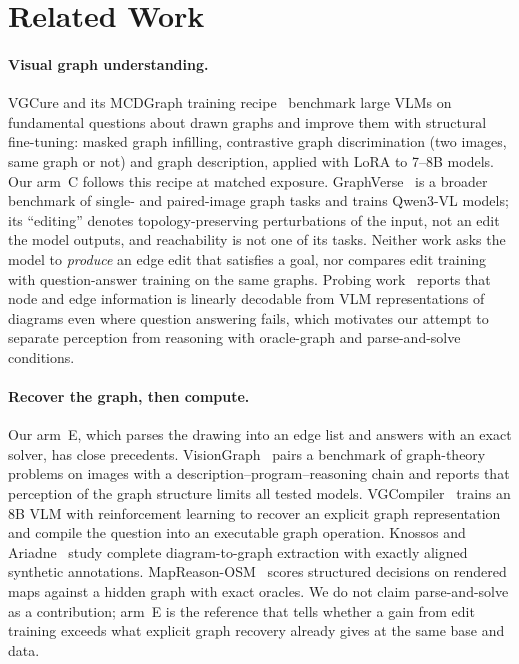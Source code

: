 \section{Related Work}
\label{sec:related}

\paragraph{Visual graph understanding.}
VGCure and its MCDGraph training recipe~\cite{mcdgraph} benchmark large VLMs on
fundamental questions about drawn graphs and improve them with structural fine-tuning:
masked graph infilling, contrastive graph discrimination (two images, same graph or not)
and graph description, applied with LoRA to 7--8B models. Our arm~C follows this recipe
at matched exposure. GraphVerse~\cite{graphverse} is a broader benchmark of single- and
paired-image graph tasks and trains Qwen3-VL models; its ``editing'' denotes
topology-preserving perturbations of the input, not an edit the model outputs, and
reachability is not one of its tasks. Neither work asks the model to \emph{produce} an
edge edit that satisfies a goal, nor compares edit training with question-answer training
on the same graphs. Probing work~\cite{signals} reports that node and edge information
is linearly decodable from VLM representations of diagrams even where question answering
fails, which motivates our attempt to separate perception from reasoning with oracle-graph and
parse-and-solve conditions.

\paragraph{Recover the graph, then compute.}
Our arm~E, which parses the drawing into an edge list and answers with an exact solver,
has close precedents. VisionGraph~\cite{visiongraph} pairs a benchmark of graph-theory
problems on images with a description--program--reasoning chain and reports that
perception of the graph structure limits all tested models. VGCompiler~\cite{vgcompiler}
trains an 8B VLM with reinforcement learning to recover an explicit graph representation
and compile the question into an executable graph operation. Knossos and
Ariadne~\cite{knossos} study complete diagram-to-graph extraction with exactly aligned
synthetic annotations. MapReason-OSM~\cite{mapreason} scores structured decisions on
rendered maps against a hidden graph with exact oracles. We do not claim parse-and-solve
as a contribution; arm~E is the reference that tells whether a gain from edit training
exceeds what explicit graph recovery already gives at the same base and data.

